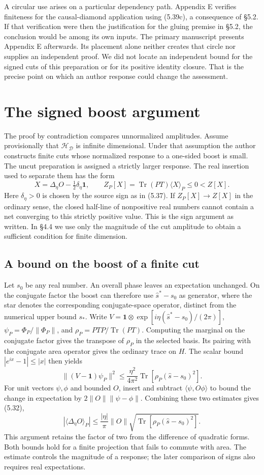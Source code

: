 \documentclass[11pt]{article}
\newcommand{\Tr}{\operatorname{Tr}}
\newcommand{\id}{\mathbf{1}}
\newcommand{\HH}{\mathcal H_{\mathcal D}}
\newcommand{\areaop}{\hat s}
\newcommand{\parttitle}[2]{\clearpage\section{#1}\markboth{#2}{#2}}
\begin{document}
A circular use arises on a particular dependency path. Appendix E verifies finiteness for the causal-diamond application using (5.39c), a consequence of \S5.2. If that verification were then the justification for the gluing premise in \S5.2, the conclusion would be among its own inputs. The primary manuscript presents Appendix E afterwards. Its placement alone neither creates that circle nor supplies an independent proof. We did not locate an independent bound for the signed cuts of this preparation or for its positive identity closure. That is the precise point on which an author response could change the assessment.

\parttitle{The signed boost argument}{The signed boost argument}
The proof by contradiction compares unnormalized amplitudes. Assume provisionally that $\HH$ is infinite dimensional. Under that assumption the author constructs finite cuts whose normalized response to a one-sided boost is small. The uncut preparation is assigned a strictly larger response. The real insertion used to separate them has the form
\begin{equation}\label{eq:signed}
 X=\Delta_\eta O-\tfrac12\delta_\eta\id,\qquad
 Z_P[X]=\Tr(PT)\langle X\rangle_P\le0<Z[X].
\end{equation}
Here $\delta_\eta>0$ is chosen by the source sign as in (5.37). If $Z_P[X]\to Z[X]$ in the ordinary sense, the closed half-line of nonpositive real numbers cannot contain a net converging to this strictly positive value. This is the sign argument as written. In \S4.4 we use only the magnitude of the cut amplitude to obtain a sufficient condition for finite dimension.

\subsection{A bound on the boost of a finite cut}
Let $s_0$ be any real number. An overall phase leaves an expectation unchanged. On the conjugate factor the boost can therefore use $\areaop^*-s_0$ as generator, where the star denotes the corresponding conjugate-space operator, distinct from the numerical upper bound $s_*$. Write $V=\id\otimes\exp[i\eta(\areaop^*-s_0)/(2\pi)]$, $\psi_P=\Phi_P/\|\Phi_P\|$, and $\rho_P=PTP/\Tr(PT)$. Computing the marginal on the conjugate factor gives the transpose of $\rho_P$ in the selected basis. Its pairing with the conjugate area operator gives the ordinary trace on $H$. The scalar bound $|e^{ix}-1|\le|x|$ then yields
\[
 \|(V-\id)\psi_P\|^2
 \le \frac{\eta^2}{4\pi^2}\Tr[\rho_P(\areaop-s_0)^2].
\]
For unit vectors $\psi,\phi$ and bounded $O$, insert and subtract $\langle\psi,O\phi\rangle$ to bound the change in expectation by $2\|O\|\|\psi-\phi\|$. Combining these two estimates gives (5.32),
\[
 |\langle\Delta_\eta O\rangle_P|
 \le \frac{|\eta|}{\pi}\|O\|\sqrt{\Tr[\rho_P(\areaop-s_0)^2]} .
\]
This argument retains the factor of two from the difference of quadratic forms. Both bounds hold for a finite projection that fails to commute with area. The estimate controls the magnitude of a response; the later comparison of signs also requires real expectations.
\end{document}
